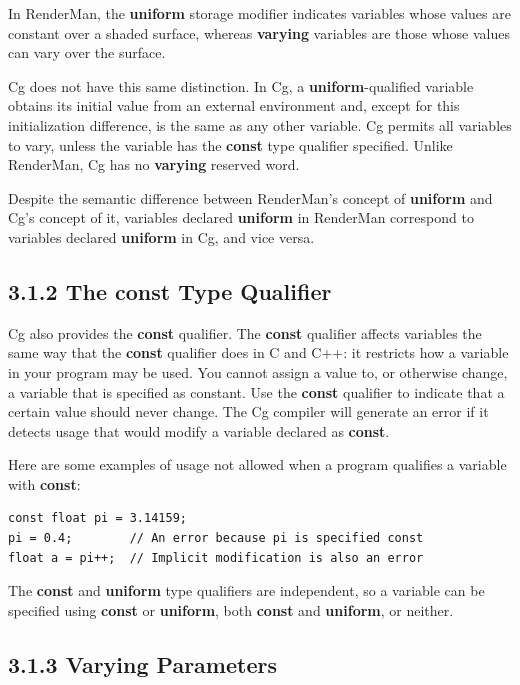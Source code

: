 \documentclass{book}
\begin{document}
In RenderMan, the \textbf{uniform} storage modifier indicates variables whose values are constant over a shaded surface, whereas \textbf{varying} variables are those whose values can vary over the surface.

Cg does not have this same distinction. In Cg, a \textbf{uniform}-qualified variable obtains its initial value from an external environment and, except for this initialization difference, is the same as any other variable. Cg permits all variables to vary, unless the variable has the \textbf{const} type qualifier specified. Unlike RenderMan, Cg has no \textbf{varying} reserved word.

Despite the semantic difference between RenderMan's concept of \textbf{uniform} and Cg's concept of it, variables declared \textbf{uniform} in RenderMan correspond to variables declared \textbf{uniform} in Cg, and vice versa.

\subsection{3.1.2 The \textbf{const} Type Qualifier}

Cg also provides the \textbf{const} qualifier. The \textbf{const} qualifier affects variables the same way that the \textbf{const} qualifier does in C and C++: it restricts how a variable in your program may be used. You cannot assign a value to, or otherwise change, a variable that is specified as constant. Use the \textbf{const} qualifier to indicate that a certain value should never change. The Cg compiler will generate an error if it detects usage that would modify a variable declared as \textbf{const}.

Here are some examples of usage not allowed when a program qualifies a variable with \textbf{const}:

\FloatBarrier
\begin{lstlisting}
const float pi = 3.14159;
pi = 0.4;        // An error because pi is specified const
float a = pi++;  // Implicit modification is also an error
\end{lstlisting}
\FloatBarrier

The \textbf{const} and \textbf{uniform} type qualifiers are independent, so a variable can be specified using \textbf{const} or \textbf{uniform}, both \textbf{const} and \textbf{uniform}, or neither.

\subsection{3.1.3 Varying Parameters}
\end{document}
